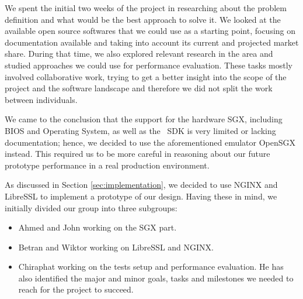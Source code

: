 \documentclass[../main.tex]{subfiles}
\begin{document}

We spent the initial two weeks of the project in researching about the problem
definition and what would be the best approach to solve it. We looked at the
available open source softwares that we could use as a starting point, focusing
on documentation available and taking into account its current and projected
market share. During that time, we also explored relevant research in the area
and studied approaches we could use for performance evaluation. These tasks
mostly involved collaborative work, trying to get a better insight into the
scope of the project and the software landscape and therefore we did not split
the work between individuals.

We came to the conclusion that the support for the hardware SGX, including BIOS and
Operating System, as well as the \Intel~SDK is very limited or lacking
documentation; hence, we decided to use the aforementioned emulator OpenSGX
instead. This required us to be more careful in reasoning about our future
prototype performance in a real production environment.

As discussed in Section \ref{sec:implementation}, we decided to use NGINX and
LibreSSL to implement a prototype of our design. Having these in
mind, we initially divided our group into three subgroups:

\begin{itemize}
	\item Ahmed and John working on the SGX part.
	\item Betran and Wiktor working on LibreSSL and NGINX.
	\item Chiraphat working on the tests setup and performance evaluation.
          He has also identified the major and minor goals, tasks and
          milestones we needed to reach for the project to succeed. %
\end{itemize}


\end{document}
